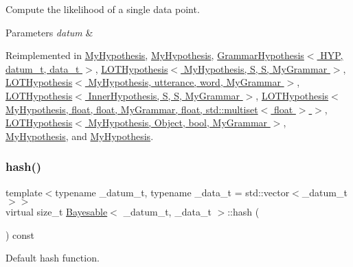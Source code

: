 Compute the likelihood of a single data point. 


\begin{DoxyParams}{Parameters}
{\em datum} & \\
\hline
\end{DoxyParams}


Reimplemented in \hyperlink{class_my_hypothesis_af2470b1e04711c06ee551deae15af4c1}{My\+Hypothesis}, \hyperlink{class_my_hypothesis_a480fc9e50d0faa0f5226f56187fd2eec}{My\+Hypothesis}, \hyperlink{class_grammar_hypothesis_ad8e5300800646a0c0af9a0f7d0b86422}{Grammar\+Hypothesis$<$ H\+Y\+P, datum\+\_\+t, data\+\_\+t $>$}, \hyperlink{class_l_o_t_hypothesis_a0ff11e5e328fcfa819a8dd9b5d57bd65}{L\+O\+T\+Hypothesis$<$ My\+Hypothesis, S, S, My\+Grammar $>$}, \hyperlink{class_l_o_t_hypothesis_a0ff11e5e328fcfa819a8dd9b5d57bd65}{L\+O\+T\+Hypothesis$<$ My\+Hypothesis, utterance, word, My\+Grammar $>$}, \hyperlink{class_l_o_t_hypothesis_a0ff11e5e328fcfa819a8dd9b5d57bd65}{L\+O\+T\+Hypothesis$<$ Inner\+Hypothesis, S, S, My\+Grammar $>$}, \hyperlink{class_l_o_t_hypothesis_a0ff11e5e328fcfa819a8dd9b5d57bd65}{L\+O\+T\+Hypothesis$<$ My\+Hypothesis, float, float, My\+Grammar, float, std\+::multiset$<$ float $>$ $>$}, \hyperlink{class_l_o_t_hypothesis_a0ff11e5e328fcfa819a8dd9b5d57bd65}{L\+O\+T\+Hypothesis$<$ My\+Hypothesis, Object, bool, My\+Grammar $>$}, \hyperlink{class_my_hypothesis_af23a45a03a28ea4f42438e70d47acacb}{My\+Hypothesis}, and \hyperlink{class_my_hypothesis_af23a45a03a28ea4f42438e70d47acacb}{My\+Hypothesis}.

\mbox{\label{class_bayesable_a26f6d55e7526ebd897cbb27c757b611b}} 
\subsubsection{\texorpdfstring{hash()}{hash()}}
{\footnotesize\ttfamily template$<$typename \+\_\+datum\+\_\+t, typename \+\_\+data\+\_\+t = std\+::vector$<$\+\_\+datum\+\_\+t$>$$>$ \\
virtual size\+\_\+t \hyperlink{class_bayesable}{Bayesable}$<$ \+\_\+datum\+\_\+t, \+\_\+data\+\_\+t $>$\+::hash (\begin{DoxyParamCaption}{ }\end{DoxyParamCaption}) const\hspace{0.3cm}{\ttfamily [pure virtual]}}



Default hash function. 



